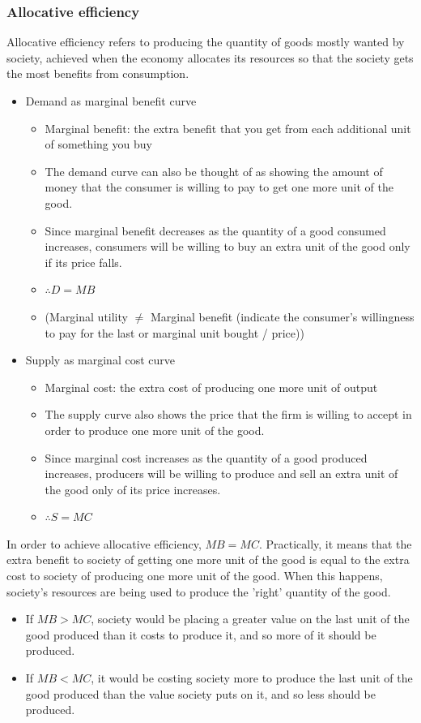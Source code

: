 \subsubsection*{Allocative efficiency}
Allocative efficiency refers to producing the quantity of goods mostly wanted by society, achieved when the economy allocates its resources so that the society gets the most benefits from consumption. 
\begin{itemize}
  \item Demand as marginal benefit curve
  \begin{itemize}
    \item Marginal benefit: the extra benefit that you get from each additional unit of something you buy
    \item The demand curve can also be thought of as showing the amount of money that the consumer is willing to pay to get one more unit of the good.
    \item Since marginal benefit decreases as the quantity of a good consumed increases, consumers will be willing to buy an extra unit of the good only if its price falls.
    \item $\therefore D=MB$
    \item (Marginal utility $\neq$ Marginal benefit (indicate the consumer's willingness to pay for the last or marginal unit bought / price))
  \end{itemize}
  \item Supply as marginal cost curve
  \begin{itemize}
    \item Marginal cost: the extra cost of producing one more unit of output
    \item The supply curve also shows the price that the firm is willing to accept in order to produce one more unit of the good.
    \item Since marginal cost increases as the quantity of a good produced increases, producers will be willing to produce and sell an extra unit of the good only of its price increases. 
    \item $\therefore S=MC$
  \end{itemize}
\end{itemize}
In order to achieve allocative efficiency, $MB=MC$. Practically, it means that the extra benefit to society of getting one more unit of the good is equal to the extra cost to society of producing one more unit of the good. When this happens, society's resources are being
used to produce the 'right' quantity of the good.
\begin{itemize}
  \item If $MB>MC$, society would be placing a greater value on the last unit of the good produced than it costs to produce it, and so more of it should be produced.
  \item If $MB<MC$, it would be costing society more to produce the last unit of the good produced than the value society puts on it, and so less should be produced.
\end{itemize}
